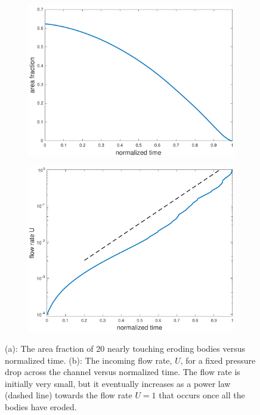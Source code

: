 \documentclass[preprint, 10pt]{elsarticle}
\begin{document}
\begin{figure}[H]
\begin{subfigure}[b]{0.55\textwidth}
\includegraphics*[width =\linewidth]{./figs/porosity20dense}
\caption{}
\end{subfigure}
\begin{subfigure}[b]{0.5\textwidth}
\includegraphics*[width =\linewidth]{./figs/flow_rate20dense}
\caption{}
\end{subfigure}
\caption{\label{fig:Eroding20flowrate}(a): The area fraction of 20
nearly touching eroding bodies versus normalized time. (b): The incoming
flow rate, $U$, for a fixed pressure drop across the channel versus
normalized time.  The flow rate is initially very small, but it
eventually increases as a power law (dashed line) towards the flow rate
$U=1$ that occurs once all the bodies have eroded.}
\end{figure}
\end{document}
